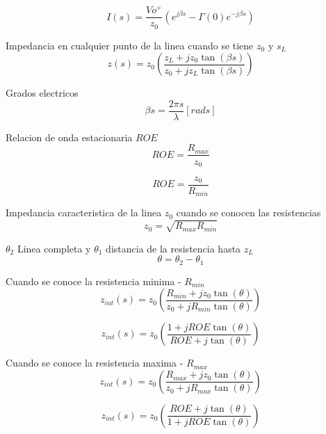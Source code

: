 \documentclass[12pt,letterpaper]{article}
\begin{document}
\begin{equation}
    I(s)=\frac{Vo^{+}}{z_0}(e^{j \beta s}-\Gamma(0)e^{-j \beta s})
\end{equation}

Impedancia en cualquier punto de la linea cuando se tiene $z_0$ y $s_L$
\begin{equation}
    z(s)=z_{0}(\frac{z_{L}+jz_{0}\tan(\beta s)}{z_{0}+jz_{L}\tan(\beta s)})
\end{equation}

Grados electricos
\begin{equation}
    \beta s=\frac{2 \pi s}{\lambda} [rads] 
\end{equation}

Relacion de onda estacionaria $ROE$
\begin{equation}
    ROE=\frac{R_{max}}{z_0}
\end{equation}

\begin{equation}
    ROE=\frac{z_0}{R_{min}}
\end{equation}

Impedancia caracteristica de la linea $z_{0}$ cuando se conocen las resistencias
\begin{equation}
    z_{0}=\sqrt{R_{max} R_{min}}
\end{equation}

$\theta_{2}$ Linea completa y $\theta_{1}$ distancia de la resistencia hasta $z_{L}$
\begin{equation}
    \theta=\theta_2-\theta_1
\end{equation}

Cuando se conoce la resistencia minima - $R_{min}$
\begin{equation}
    z_{int}(s)=z_{0}(\frac{R_{min}+jz_{0}\tan(\theta)}{z_{0}+jR_{min}\tan(\theta)})
\end{equation}

\begin{equation}
    z_{int}(s)=z_{0}(\frac{1+jROE\tan(\theta)}{ROE+j\tan(\theta)})
\end{equation}

Cuando se conoce la resistencia maxima - $R_{max}$
\begin{equation}
    z_{int}(s)=z_{0}(\frac{R_{max}+jz_{0}\tan(\theta)}{z_{0}+jR_{max}\tan(\theta)})
\end{equation}

\begin{equation}
    z_{int}(s)=z_{0}(\frac{ROE+j\tan(\theta)}{1+jROE\tan(\theta)})
\end{equation}
\end{document}
